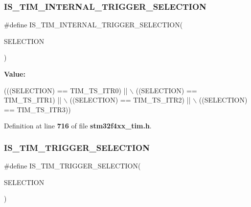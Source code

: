 \subsubsection{I\+S\+\_\+\+T\+I\+M\+\_\+\+I\+N\+T\+E\+R\+N\+A\+L\+\_\+\+T\+R\+I\+G\+G\+E\+R\+\_\+\+S\+E\+L\+E\+C\+T\+I\+ON}
{\footnotesize\ttfamily \#define I\+S\+\_\+\+T\+I\+M\+\_\+\+I\+N\+T\+E\+R\+N\+A\+L\+\_\+\+T\+R\+I\+G\+G\+E\+R\+\_\+\+S\+E\+L\+E\+C\+T\+I\+ON(\begin{DoxyParamCaption}\item[{}]{S\+E\+L\+E\+C\+T\+I\+ON }\end{DoxyParamCaption})}

{\bfseries Value\+:}
\begin{DoxyCode}
(((SELECTION) == TIM_TS_ITR0) || \(\backslash\)
                                                      ((SELECTION) == 
      TIM_TS_ITR1) || \(\backslash\)
                                                      ((SELECTION) == 
      TIM_TS_ITR2) || \(\backslash\)
                                                      ((SELECTION) == 
      TIM_TS_ITR3))
\end{DoxyCode}


Definition at line \textbf{ 716} of file \textbf{ stm32f4xx\+\_\+tim.\+h}.

\mbox{\label{group__TIM__Internal__Trigger__Selection_ga36e47cf625c695a368a68280e950dfbc}} 
\subsubsection{I\+S\+\_\+\+T\+I\+M\+\_\+\+T\+R\+I\+G\+G\+E\+R\+\_\+\+S\+E\+L\+E\+C\+T\+I\+ON}
{\footnotesize\ttfamily \#define I\+S\+\_\+\+T\+I\+M\+\_\+\+T\+R\+I\+G\+G\+E\+R\+\_\+\+S\+E\+L\+E\+C\+T\+I\+ON(\begin{DoxyParamCaption}\item[{}]{S\+E\+L\+E\+C\+T\+I\+ON }\end{DoxyParamCaption})}

